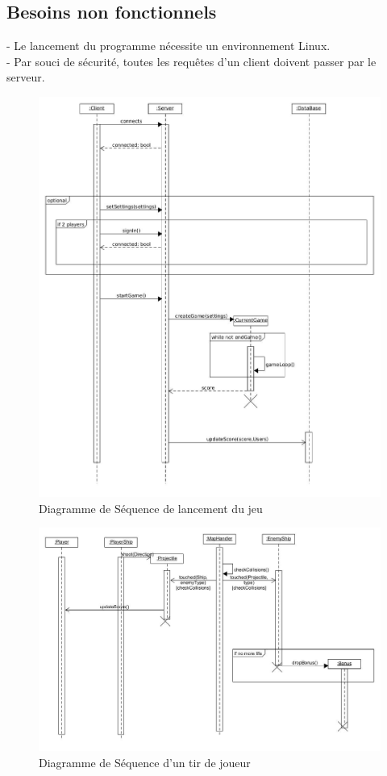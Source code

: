 \documentclass[a4paper,12pt]{article}
\begin{document}
\subsection{Besoins non fonctionnels}

- Le lancement du programme nécessite un environnement Linux.\\
- Par souci de sécurité, toutes les requêtes d'un client doivent passer par le serveur.


\begin{figure}[hbtp]
\centering
\includegraphics[scale=0.3]{images/sequence_diagram_StartGame}
\caption{Diagramme de Séquence de lancement du jeu}
\end{figure}

\begin{figure}[hbtp]
\centering
\includegraphics[scale=0.3]{images/player_shooting.jpg}
\caption{Diagramme de Séquence d'un tir de joueur}
\end{figure}
\end{document}
